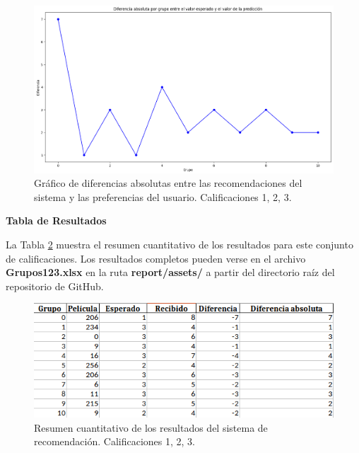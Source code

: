 \documentclass[twocolumn, fontsize=10pt]{article}
\begin{document}
\begin{figure}[h]
    \centering
    \includegraphics[width=\columnwidth]{assets/absolutas123.png}
    \caption{Gráfico de diferencias absolutas entre las recomendaciones del sistema y las preferencias del usuario. Calificaciones 1, 2, 3.}
    \label{fig:absolutas2}
\end{figure}

\textbf{Tabla de Resultados}

La Tabla \ref{tab:resultados2} muestra el resumen cuantitativo de los resultados para este conjunto de calificaciones. Los resultados completos 
pueden verse en el archivo \textbf{Grupos123.xlsx} en la ruta \textbf{report/assets/} a partir del directorio raíz del repositorio de GitHub.

\begin{figure}[h]
    \centering
    \includegraphics[width=\columnwidth]{assets/tabla123.png}
    \caption{Resumen cuantitativo de los resultados del sistema de recomendación. Calificaciones 1, 2, 3.}
    \label{tab:resultados2}
\end{figure}
\end{document}
